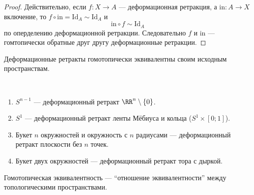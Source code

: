 \documentclass[12pt,a4paper]{article}
\newcommand{\Id}{\ensuremath{\mathrm{Id}}\xspace}
\newcommand{\incl}{\mathrm{in}}
\begin{document}
    \begin{proof}
        Действительно, если $f: X \to A$ --- деформационная ретракция, а $\incl: A \to X$ включение, то $f \circ \incl = \Id_A \sim \Id_A$ и
        \[\incl \circ f \sim \Id_A\]
        по оперделению деформационной ретракции. Следовательно $f$ и $\incl$ --- гомтопически обратные друг другу деформационные ретракции.
    \end{proof}

    \begin{corollary}
        Деформационные ретракты гомотопически эквивалентны своим исходным пространствам.
    \end{corollary}

    \begin{example}\ 
        \begin{enumerate}
            \item $S^{n-1}$ --- деформационный ретракт $\RR^n \setminus \{0\}$.
            \item $S^1$ --- деформационный ретракт ленты Мёбиуса и кольца ($S^1 \times [0; 1]$).
            \item Букет $n$ окружностей и окружность с $n$ радиусами --- деформационный ретракт плоскости без $n$ точек.
            \item Букет двух окружностей --- деформационный ретракт тора с дыркой.
        \end{enumerate}
    \end{example}

    \begin{theorem}
        Гомотопическая эквивалентность --- ``отношение эквивалентности'' между топологическими пространствами.
    \end{theorem}
\end{document}
